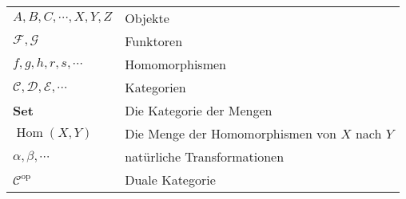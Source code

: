 \documentclass[a4paper]{amsart}
\theoremstyle{definition}
\DeclareMathOperator{\Hom}{Hom}
\begin{document}
\renewcommand*{\arraystretch}{1}

\begin{tabular}{ll}
    $A, B, C, \cdots, X, Y, Z$          & Objekte\\
    $\mathcal F,\mathcal G$             & Funktoren\\
    $f, g, h, r, s, \cdots$             & Homomorphismen\\
    $\mathcal C, \mathcal D, \mathcal E, \cdots$ & Kategorien\\
    \textbf{Set}                        & Die Kategorie der Mengen\\
    $\Hom( X, Y)$                       & Die Menge der Homomorphismen von $X$ nach $Y$\\
    $\alpha, \beta, \cdots$             & natürliche Transformationen\\
    $\mathcal C ^{\text{op}}$           & Duale Kategorie
\end{tabular}
\end{document}
